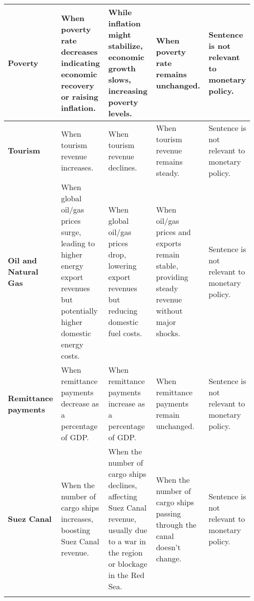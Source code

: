 \begin{longtable}{p{}p{}p{}p{}p{}}
\midrule
\textbf{Poverty} & When poverty rate decreases indicating economic recovery or raising inflation. & While inflation might stabilize, economic growth slows, increasing poverty levels. & When poverty rate remains unchanged. & Sentence is not relevant to monetary policy. \\
\midrule
\textbf{Tourism} & When tourism revenue increases. & When tourism revenue declines. & When tourism revenue remains steady. & Sentence is not relevant to monetary policy. \\
\midrule
\textbf{Oil and Natural Gas} & When global oil/gas prices surge, leading to higher energy export revenues but potentially higher domestic energy costs. & When global oil/gas prices drop, lowering export revenues but reducing domestic fuel costs. & When oil/gas prices and exports remain stable, providing steady revenue without major shocks. & Sentence is not relevant to monetary policy. \\
\midrule
\textbf{Remittance payments} & When remittance payments decrease as a percentage of GDP. & When remittance payments increase as a percentage of GDP. & When remittance payments remain unchanged. & Sentence is not relevant to monetary policy. \\
\midrule
\textbf{Suez Canal} & When the number of cargo ships increases, boosting Suez Canal revenue. & When the number of cargo ships declines, affecting Suez Canal revenue, usually due to a war in the region or blockage in the Red Sea. & When the number of cargo ships passing through the canal doesn’t change. & Sentence is not relevant to monetary policy. \\
\bottomrule
\label{tb:cbe_mp_stance_guide}
\end{longtable}
